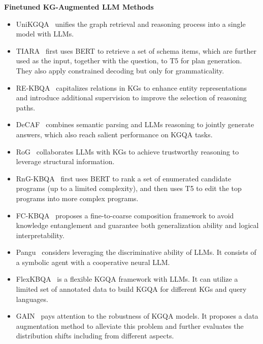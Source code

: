 \documentclass{article}
\begin{document}
\noindent \textbf{Finetuned KG-Augmented LLM Methods}
\begin{itemize} [leftmargin=1cm] 
    \item UniKGQA~\cite{jiang2023unikgqa} unifies the graph retrieval and reasoning process into a single model with LLMs.
    \item TIARA~\cite{shu2022tiara} first uses BERT to retrieve a set of schema items, which are further used as the input, together with the question, to T5 for plan generation. They also apply constrained decoding but only for grammaticality.
    \item RE-KBQA~\cite{cao2023pay} capitalizes relations in KGs to enhance entity representations and introduce additional supervision to improve the selection of reasoning paths.
    \item DeCAF~\cite{yu2023decaf} combines semantic parsing and LLMs reasoning to jointly generate answers, which also reach salient performance on KGQA tasks.
    \item RoG~\cite{luo2024reasoning} collaborates LLMs with KGs to achieve trustworthy reasoning to leverage structural information.
    \item RnG-KBQA~\cite{ye2022rng} first uses BERT to rank a set of enumerated candidate programs (up to a limited complexity), and then uses T5 to edit the top programs into more complex programs.
    \item FC-KBQA~\cite{zhang2023fc} proposes a fine-to-coarse composition framework to avoid knowledge entanglement and guarantee both generalization ability and logical interpretability. 
    \item Pangu~\cite{gu2023don} considers leveraging the discriminative ability of LLMs. It consists of a symbolic agent with a cooperative neural LLM.
    \item FlexKBQA~\cite{li2024flexkbqa} is a flexible KGQA framework with LLMs. It can utilize a limited set of annotated data to build KGQA for different KGs and query languages.
    \item GAIN~\cite{shu2024distribution} pays attention to the robustness of KGQA models. It proposes a data augmentation method to alleviate this problem and further evaluates the distribution shifts including from different aspects.
\end{itemize}
\end{document}
